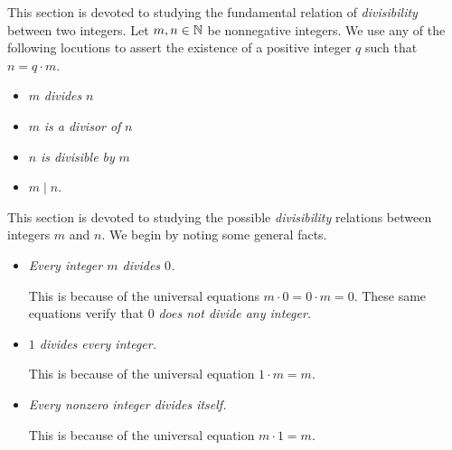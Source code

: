 This section is devoted to studying the fundamental relation of {\em
  divisibility} between two integers.  Let $m, n \in \mathbb{N}$ be
nonnegative integers.  We use any of the following locutions to assert
the existence of a positive integer $q$ such that $n = q \cdot m$.
\begin{itemize}
\item
$m$ {\it divides} $n$
\item
$m$ {\it is a divisor of} $n$
\item
$n$ {\it is divisible by} $m$
\item
$m \mid n$.
\end{itemize}
This section is devoted to studying the possible {\it divisibility}
relations between integers $m$ and $n$.  We begin by noting some
general facts.
\begin{itemize}
\item
{\em Every integer $m$ divides $0$.}

This is because of the universal equations $m \cdot 0 = 0 \cdot m =
0$.  These same equations verify that $0$ {\em does not divide any
integer.}

\item
{\em $1$ divides every integer.}

This is because of the universal equation $1 \cdot m = m$.
\item
{\em Every nonzero integer divides itself.}

This is because of the universal equation $m \cdot 1 = m$.
\end{itemize}

